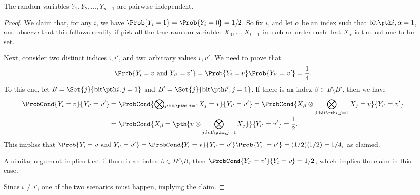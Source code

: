 \begin{lemma}
    The random variables $Y_1, Y_2, \ldots, Y_{n-1}$ are pairwise
    independent.
\end{lemma}
\begin{proof}
    We claim that, for any $i$, we have
    $\Prob{Y_i=1} = \Prob{Y_i=0} =1/2$.  So fix $i$, and let $\alpha$
    be an index such that $\bitY{i}{\alpha} =1$, and observe that this
    follows readily if pick all the true random variables
    $X_0, \ldots, X_{t-1}$ in such an order such that $X_\alpha$ is
    the last one to be set. 
    
    Next, consider two distinct indices $i,i'$, and two arbitrary
    values $v, v'$. We need to prove that
    \begin{equation*}
        \Prob{Y_{i} = v \text{ and } Y_{i'} = v'}%
        =%
        \Prob{Y_{i} = v} \Prob{ Y_{i'} = v'}%
        =%
        \frac{1}{4}.
    \end{equation*}
    To this end, let $B = \Set{j}{ \bitY{i}{j}=1}$ and
    $B' = \Set{j}{ \bitY{i'}{j}=1}$. If there is an index
    $\beta \in B \setminus B'$, then we have
    \begin{align*}
      \ProbCond{Y_{i} = v}{ Y_{i'} = v' }%
      &=%
        \ProbCond{\Bigl.\smash \bigotimes_{j: \bitY{i}{j} = 1} X_j= v}{ Y_{i'} = v' }%
        =%
        \ProbCond{\Bigl. X_\beta \otimes
        {\Bigl.\smash{\bigotimes_{j: \bitY{i}{j} = 1} X_j}}=
        v}{ Y_{i'} = v' }%
      \\[0,2cm]
      &%
        =%
        \ProbCond{\Bigl. X_\beta =
        \pth{\Bigl.v \otimes
        \smash{\bigotimes_{j: \bitY{i}{j} = 1} X_j}}}{ Y_{i'} = v' }%
        =%
        \frac{1}{2}.
        \phantom{\bigotimes_{j}}%
    \end{align*}
    This implies that
    \begin{math}
        \Prob{Y_{i} = v \text{ and } Y_{i'} = v'}%
        =%
        \ProbCond{Y_{i} = v}{ Y_{i'} = v' } \Prob{Y_{i'} = v'}
        =(1/2)(1/2) = 1/4,
    \end{math}
    as claimed.

            
    A similar argument implies that if there is an index
    $\beta \in B' \setminus B$, then
    $\ProbCond{Y_{i'} = v'}{ Y_{i} = v } = 1/2$, which implies the
    claim in this case.

    Since $i \neq i'$, one of the two scenarios must happen, implying
    the claim.
\end{proof}        


